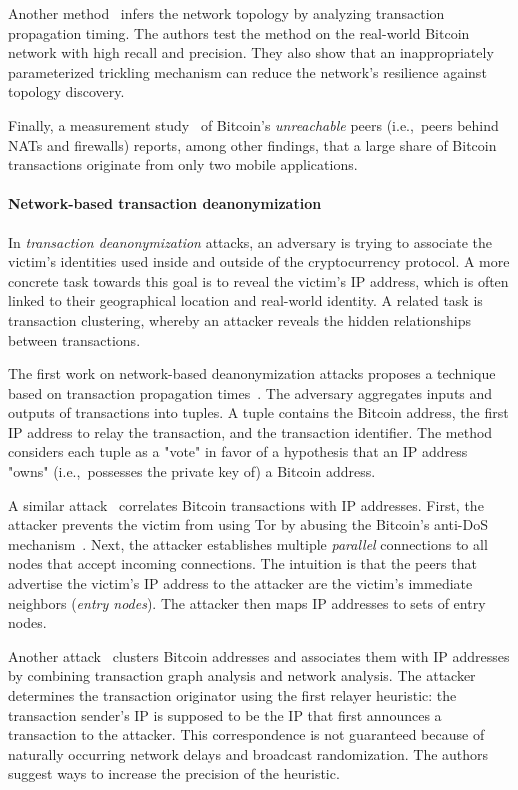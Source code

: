 Another method~\cite{Neudecker2016} infers the network topology by analyzing transaction propagation timing.
The authors test the method on the real-world Bitcoin network with high recall and precision.
They also show that an inappropriately parameterized trickling mechanism can reduce the network's resilience against topology discovery.

Finally, a measurement study~\cite{Wang2017} of Bitcoin's \textit{unreachable} peers (i.e.,~peers behind NATs and firewalls) reports, among other findings, that a large share of Bitcoin transactions originate from only two mobile applications.


\paragraph{Network-based transaction deanonymization}

In \textit{transaction deanonymization} attacks, an adversary is trying to associate the victim's identities used inside and outside of the cryptocurrency protocol.
A more concrete task towards this goal is to reveal the victim's IP address, which is often linked to their geographical location and real-world identity.
A related task is transaction clustering, whereby an attacker reveals the hidden relationships between transactions.

The first work on network-based deanonymization attacks proposes a technique based on transaction propagation times~\cite{Koshy2014}.
The adversary aggregates inputs and outputs of transactions into tuples.
A tuple contains the Bitcoin address, the first IP address to relay the transaction, and the transaction identifier.
The method considers each tuple as a "vote" in favor of a hypothesis that an IP address "owns" (i.e.,~possesses the private key of) a Bitcoin address.

A similar attack~\cite{Biryukov2014} correlates Bitcoin transactions with IP addresses.
First, the attacker prevents the victim from using Tor by abusing the Bitcoin's anti-DoS mechanism~\cite{Biryukov2015}.
Next, the attacker establishes multiple \textit{parallel} connections to all nodes that accept incoming connections.
The intuition is that the peers that advertise the victim's IP address to the attacker are the victim's immediate neighbors (\textit{entry nodes}).
The attacker then maps IP addresses to sets of entry nodes.

Another attack~\cite{Neudecker2017} clusters Bitcoin addresses and associates them with IP addresses by combining transaction graph analysis and network analysis.
The attacker determines the transaction originator using the first relayer heuristic: the transaction sender's IP is supposed to be the IP that first announces a transaction to the attacker.
This correspondence is not guaranteed because of naturally occurring network delays and broadcast randomization.
The authors suggest ways to increase the precision of the heuristic.

